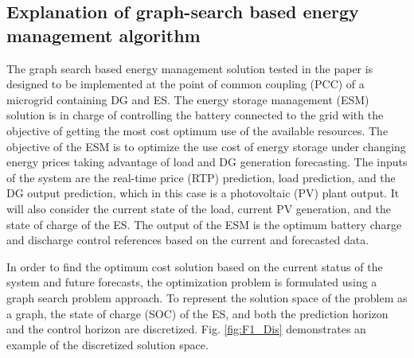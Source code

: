 \subsection{Explanation of graph-search based energy management algorithm}
The graph search based energy management solution tested in the paper is designed to be implemented at the point of common coupling (PCC) of a microgrid containing DG and ES. The energy storage management (ESM) solution is in charge of controlling the battery connected to the grid with the objective of getting the most cost optimum use of the available resources. The objective of the ESM is to optimize the use cost of energy storage under changing energy prices taking advantage of load and DG generation forecasting. The inputs of the system are the real-time price (RTP) prediction, load prediction, and the DG output prediction, which in this case is a photovoltaic (PV) plant output. It will also consider the current state of the load, current PV generation, and the state of charge of the ES. The output of the ESM is the optimum battery charge and discharge control references based on the current and forecasted data.




In order to find the optimum cost solution based on the current status of the system and future forecasts, the optimization problem is formulated using a graph search problem approach. To represent the solution space of the problem as a graph, the state of charge (SOC) of the ES, and both the prediction horizon and the control horizon are discretized. Fig. \ref{fig:F1_Dis} demonstrates an example of the discretized solution space.

